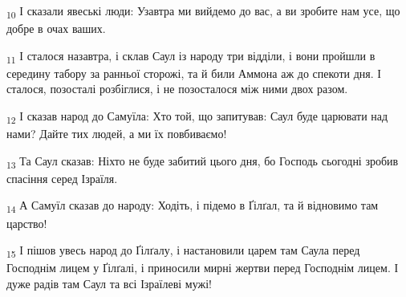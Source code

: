 \begin{tcolorbox}
\textsubscript{10} І сказали явеські люди: Узавтра ми вийдемо до вас, а ви зробите нам усе, що добре в очах ваших.
\end{tcolorbox}
\begin{tcolorbox}
\textsubscript{11} І сталося назавтра, і склав Саул із народу три відділи, і вони пройшли в середину табору за ранньої сторожі, та й били Аммона аж до спекоти дня. І сталося, позосталі розбіглися, і не позосталося між ними двох разом.
\end{tcolorbox}
\begin{tcolorbox}
\textsubscript{12} І сказав народ до Самуїла: Хто той, що запитував: Саул буде царювати над нами? Дайте тих людей, а ми їх повбиваємо!
\end{tcolorbox}
\begin{tcolorbox}
\textsubscript{13} Та Саул сказав: Ніхто не буде забитий цього дня, бо Господь сьогодні зробив спасіння серед Ізраїля.
\end{tcolorbox}
\begin{tcolorbox}
\textsubscript{14} А Самуїл сказав до народу: Ходіть, і підемо в Ґілґал, та й відновимо там царство!
\end{tcolorbox}
\begin{tcolorbox}
\textsubscript{15} І пішов увесь народ до Ґілґалу, і настановили царем там Саула перед Господнім лицем у Ґілґалі, і приносили мирні жертви перед Господнім лицем. І дуже радів там Саул та всі Ізраїлеві мужі!
\end{tcolorbox}
